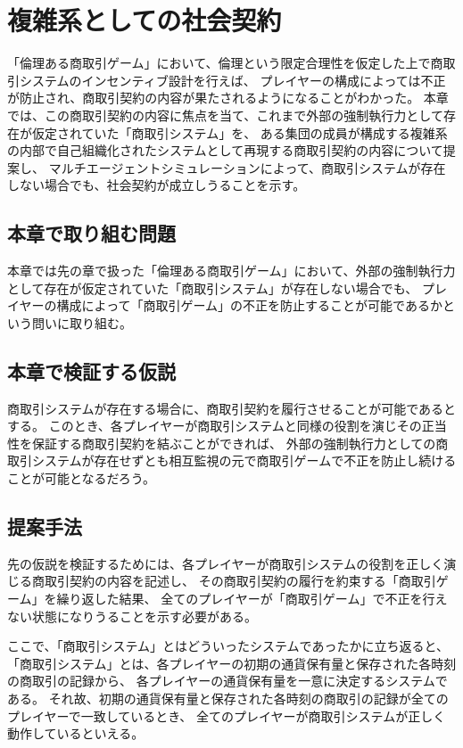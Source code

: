 \chapter{複雑系としての社会契約}
「倫理ある商取引ゲーム」において、倫理という限定合理性を仮定した上で商取引システムのインセンティブ設計を行えば、
プレイヤーの構成によっては不正が防止され、商取引契約の内容が果たされるようになることがわかった。
本章では、この商取引契約の内容に焦点を当て、これまで外部の強制執行力として存在が仮定されていた「商取引システム」を、
ある集団の成員が構成する複雑系の内部で自己組織化されたシステムとして再現する商取引契約の内容について提案し、
マルチエージェントシミュレーションによって、商取引システムが存在しない場合でも、社会契約が成立しうることを示す。

\section{本章で取り組む問題}
本章では先の章で扱った「倫理ある商取引ゲーム」において、外部の強制執行力として存在が仮定されていた「商取引システム」が存在しない場合でも、
プレイヤーの構成によって「商取引ゲーム」の不正を防止することが可能であるかという問いに取り組む。

\section{本章で検証する仮説}
商取引システムが存在する場合に、商取引契約を履行させることが可能であるとする。
このとき、各プレイヤーが商取引システムと同様の役割を演じその正当性を保証する商取引契約を結ぶことができれば、
外部の強制執行力としての商取引システムが存在せずとも相互監視の元で商取引ゲームで不正を防止し続けることが可能となるだろう。

\section{提案手法}
先の仮説を検証するためには、各プレイヤーが商取引システムの役割を正しく演じる商取引契約の内容を記述し、
その商取引契約の履行を約束する「商取引ゲーム」を繰り返した結果、
全てのプレイヤーが「商取引ゲーム」で不正を行えない状態になりうることを示す必要がある。

ここで、「商取引システム」とはどういったシステムであったかに立ち返ると、
「商取引システム」とは、各プレイヤーの初期の通貨保有量と保存された各時刻の商取引の記録から、
各プレイヤーの通貨保有量を一意に決定するシステムである。
それ故、初期の通貨保有量と保存された各時刻の商取引の記録が全てのプレイヤーで一致しているとき、
全てのプレイヤーが商取引システムが正しく動作しているといえる。


